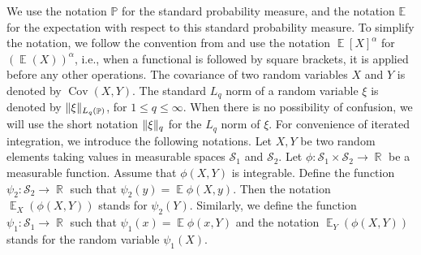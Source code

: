 \documentclass[11pt]{amsart}
\numberwithin{equation}{section}
\numberwithin{equation}{section}
\DeclareMathOperator{\E}{\mathbb{E}}
\DeclareMathOperator{\R}{\mathbb{R}}
\DeclareMathOperator{\Pb}{\mathbb{P}}
\DeclareMathOperator{\cov}{Cov}
\DeclarePairedDelimiter{\norm}{\lVert}{\rVert}
\begin{document}
We use the notation $\mathbb{P}$ for the standard probability measure, and the notation $\mathbb{E}$ for the expectation with respect to this standard probability measure. To simplify the notation, we follow the convention from \cite{brailovskaya2022universality} and use the notation $\E [X]^{\alpha}$ for $(\E(X))^{\alpha}$, i.e., when a functional is followed by square brackets, it is applied before any other operations. The covariance of two random variables $X$ and $Y$ is denoted by $\cov(X,Y)$. The standard $L_q$ norm of a random variable $\xi$ is denoted by $\norm{\xi}_{L_q(\Pb)}$, for $1 \le q \le \infty$. When there is no possibility of confusion, we will use the short notation $\norm{\xi}_{q}$ for the $L_q$ norm of $\xi$. For convenience of iterated integration, we introduce the following notations. Let $X,Y$ be two random elements taking values in measurable spaces $\mathscr{S}_1$ and $\mathscr{S}_2$. Let $\phi:\mathscr{S}_1 \times \mathscr{S}_2 \to \R$ be a measurable function. Assume that $\phi(X,Y)$ is integrable. Define the function $\psi_2:\mathscr{S}_2 \to \R$ such that $\psi_2(y)=\E\phi(X,y)$. Then the notation $\E_X(\phi(X,Y))$ stands for $\psi_2(Y)$. Similarly, we define the function $\psi_1:\mathscr{S}_1 \to \R$ such that $\psi_1(x)=\E\phi(x,Y)$ and the notation $\E_Y(\phi(X,Y))$ stands for the random variable $\psi_1(X)$.
\end{document}
